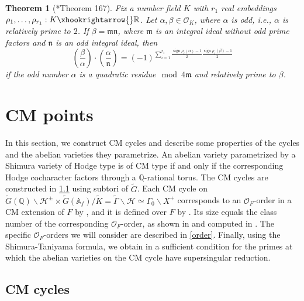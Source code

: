 \documentclass{amsart}
\numberwithin{equation}{subsection}
\newtheorem{theorem}{Theorem}
\numberwithin{theorem}{section}
\theoremstyle{definition}
\theoremstyle{remark}
\newcommand{\bA}{\mathbb{A}}
\newcommand{\bQ}{\mathbb{Q}}
\newcommand{\bR}{\mathbb{R}}
\newcommand{\cO}{\mathcal{O}}
\DeclareMathOperator{\sgn}{sign}
\begin{document}
\begin{theorem}[\cite{MR638719}*{Theorem 167}] \label{thm:quadratic_reciprocity}
        Fix a number field $K$ with $r_1$ real embeddings $\rho_1, \dotsc, \rho_{r_1}: K\xhookrightarrow{} \bR$. Let $\alpha, \beta \in \cO_K$, where $\alpha$ is odd, i.e., $\alpha$ is relatively prime to $2$. 
        If $\beta = \mathfrak{m}\mathfrak{n}$, where $\mathfrak{m}$ is an integral ideal without odd prime factors and $\mathfrak{n}$ is an odd integral ideal, then  \[\left(\frac{\beta}{\alpha}\right)\cdot \left(\frac{\alpha}{\mathfrak{n}}\right) = (-1)^{\sum_{i=1}^{r_1}\frac{\sgn\rho_i(\alpha)-1}{2}\frac{\sgn\rho_i(\beta)-1}{2}}\] if the odd number $\alpha$ is a quadratic residue$\mod 4\mathfrak{m}$ and relatively prime to $\beta$.
\end{theorem}

\section{CM points}\label{sec:CMpts}

In this section, we construct CM cycles and describe some properties of the cycles and the abelian varieties they parametrize.
An abelian variety parametrized by a Shimura variety of Hodge type is of CM type if and only if the corresponding Hodge cocharacter factors through a $\bQ$-rational torus.
The CM cycles are constructed in \cref{sec:constructCM} using subtori of $\widetilde{G}$. Each CM cycle on $\widetilde{G}(\bQ)\backslash \mathcal{H}^{\pm} \times \widetilde{G}(\bA_f) / \widetilde{K}  = \widetilde{\Gamma} \backslash \mathcal{H} \simeq \Gamma_0 \backslash  X^+$ corresponds to an $\cO_F$-order in a CM extension of $F$ by , and it is defined over $F$ by . Its size equals the class number of the corresponding $\cO_F$-order, as shown in  and computed in .  The specific $\cO_F$-orders we will consider are described in \cref{order}.  Finally, using the Shimura-Taniyama formula, we obtain in  a sufficient condition for the primes at which the abelian varieties on the CM cycle have supersingular reduction.

\subsection{CM cycles} \label{sec:constructCM}
\end{document}
